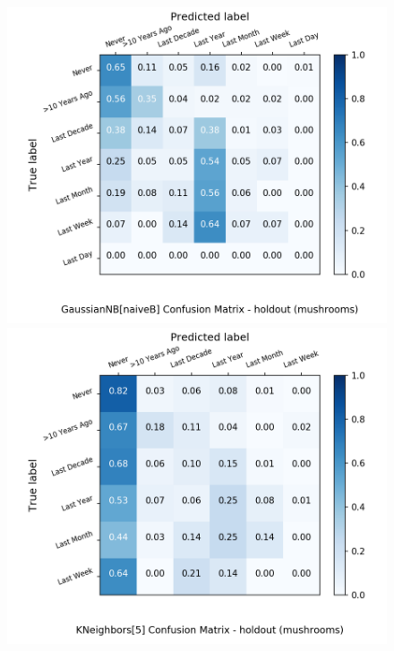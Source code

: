 \begin{figure}[H]
	\begin{minipage}[b]{0.32\textwidth}
		\includegraphics[width=1.1\textwidth]{Plots/drugs/mushrooms_GaussianNB_naiveB_balance_False_holdout.png}
	\end{minipage}
	\begin{minipage}[b]{0.32\textwidth}
		\includegraphics[width=1.1\textwidth]{Plots/drugs/mushrooms_KNeighbors_5_balance_False_holdout.png}
  \end{minipage}
	\begin{minipage}[b]{0.32\textwidth}

\end{minipage}
\end{figure}
